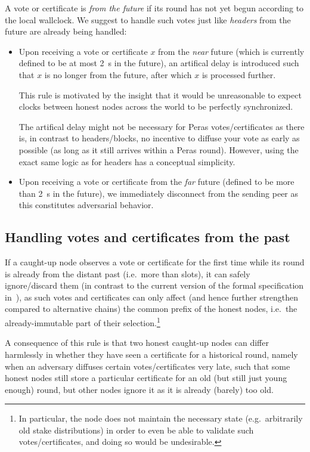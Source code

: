 A vote or certificate is \emph{from the future} if its round has not yet begun according to the local wallclock.
We suggest to handle such votes just like \emph{headers} from the future are already being handled:
\begin{itemize}
\item
  Upon receiving a vote or certificate $x$ from the \emph{near} future (which is currently defined to be at most \qty{2}{\s} in the future), an artifical delay is introduced such that $x$ is no longer from the future, after which $x$ is processed further.

  This rule is motivated by the insight that it would be unreasonable to expect clocks between honest nodes across the world to be perfectly synchronized.

  The artifical delay might not be necessary for Peras votes/certificates as there is, in contrast to headers/blocks, no incentive to diffuse your vote as early as possible (as long as it still arrives within a Peras round).
  However, using the exact same logic as for headers has a conceptual simplicity.
\item
  Upon receiving a vote or certificate from the \emph{far} future (defined to be more than \qty{2}{\s} in the future), we immediately disconnect from the sending peer as this constitutes adversarial behavior.
\end{itemize}

\subsection{Handling votes and certificates from the past}\label{sec:votes certs from the past}

If a caught-up node observes a vote or certificate for the first time while its round is already from the distant past (i.e.\ more than \Tcp{} slots), it can safely ignore/discard them (in contrast to the current version of the formal specification in~\cite{peras-cip}), as such votes and certificates can only affect (and hence further strengthen compared to alternative chains) the common prefix of the honest nodes, i.e.\ the already-immutable part of their selection.\footnote{
  In particular, the node does not maintain the necessary state (e.g.\ arbitrarily old stake distributions) in order to even be able to validate such votes/certificates, and doing so would be undesirable.}

A consequence of this rule is that two honest caught-up nodes can differ harmlessly in whether they have seen a certificate for a historical round, namely when an adversary diffuses certain votes/certificates very late, such that some honest nodes still store a particular certificate for an old (but still just young enough) round, but other nodes ignore it as it is already (barely) too old.

